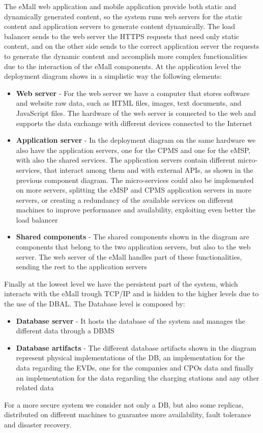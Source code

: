 The eMall web application and mobile application provide both static and dynamically generated content, so the system runs web servers for the static content and application servers to generate content dynamically. The load balancer sends to the web server the HTTPS requests that need only static content, and on the other side sends to the correct application server the requests to generate the dynamic content and accomplish more complex functionalities due to the interaction of the eMall components. 
At the application level the deployment diagram shows in a simplistic way the following elements:
\begin{itemize}
    \item \textbf{Web server} - For the web server we have a computer that stores software and website raw data, such as HTML files, images, text documents, and JavaScript files. The hardware of the web server is connected to the web and supports the data exchange with different devices connected to the Internet
    \item \textbf{Application server} - In the deployment diagram on the same hardware we also have the application servers, one for the CPMS and one for the eMSP, with also the shared services. The application servers contain different micro-services, that interact among them and with external APIs, as shown in the previous component diagram. The micro-services could also be implemented on more servers, splitting the eMSP and CPMS application servers in more servers, or creating a redundancy of the available services on different machines to improve performance and availability, exploiting even better the load balancer
    \item \textbf{Shared components} - The shared components shown in the diagram are components that belong to the two application servers, but also to the web server. The web server of the eMall handles part of these functionalities, sending the rest to the application servers  
\end{itemize}

Finally at the lowest level we have the persistent part of the system, which interacts with the eMall trough TCP/IP and is hidden to the higher levels due to the use of the DBAL. The Database level is composed by:
\begin{itemize}
    \item \textbf{Database server} - It hosts the database of the system and manages the different data through a DBMS 
    \item \textbf{Database artifacts} - The different database artifacts shown in the diagram represent physical implementations of the DB, an implementation for the data regarding the EVDs, one for the companies and CPOs data and finally an implementation for the data regarding the charging stations and any other related data
\end{itemize}
For a more secure system we consider not only a DB, but also some replicas, distributed on different machines to guarantee more availability, fault tolerance and disaster recovery. 


